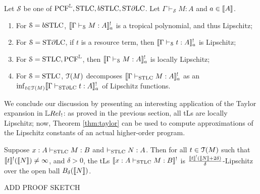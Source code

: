 \begin{theorem}
Let $\mathcal S$ be one of $\RM{PCF}^{\Lawv},\STLC,\BSTLC,\STDLC$. Let $\Gamma\vdash_{\mathcal S}M:A$ and $a\in \llbracket A\rrbracket$.
\begin{enumerate}
\item For $\mathcal S=\BSTLC$, $\llbracket\Gamma\vdash_{\mathcal S}M:A\rrbracket^{!}_{a}$ is a tropical polynomial, and thus Lipschitz;

\item For $\mathcal S=\mathrm{ST}\partial\mathrm{LC}$, if $t$ is a resource term, then $\llbracket\Gamma\vdash_{\mathcal S}t:A\rrbracket^{!}_{a}$ is Lipschitz;

\item For $\mathcal S=\mathrm{STLC},\mathrm{PCF}^{\mathbb{L}}$, then $\llbracket\Gamma\vdash_{\mathcal S}M:A\rrbracket^{!}_{a}$ is locally Lipschitz;

\item For $\mathcal S=\mathrm{STLC}$, $\mathcal{T}(M)$ decomposes $\llbracket\Gamma \vdash_{\mathrm{STLC}} M:A\rrbracket^!_{a}$ as an $\inf_{t\in\mathcal{T}(M)}\llbracket\Gamma\vdash_{\mathrm{ST}\partial\mathrm{LC}} t:A\rrbracket^!_{a}$ of {Lipschitz} functions.
\end{enumerate}

\end{theorem}




%
%
%


We conclude our discussion by presenting an interesting application of the Taylor expansion in $\LREL_{!}$: as proved in the previous section, all tLs are locally Lipschitz; now, Theorem \ref{thm:taylor} can be used to compute approximations of the Lipschitz constants of an actual higher-order program.

\begin{corollary}
Suppose $x: A \vdash_{\mathrm{STLC}}M:B$ and $\vdash_{\mathrm{STLC}} N:A$. 
Then for all $t\in \mathcal{T}(M)$ such that $\llbracket t\rrbracket^{!}(\llbracket N\rrbracket)\neq \infty$, and $\delta>0$, the tLs $\llbracket x:A\vdash_{\mathrm{STLC}}M:B\rrbracket^{!}$ is $\frac{\llbracket t\rrbracket^{!}(\llbracket N\rrbracket+2\delta)}{\delta}$-Lipschitz over the open ball
 $B_{\delta}(\llbracket N\rrbracket)$.
\end{corollary}
{\color{red}ADD PROOF SKETCH}

